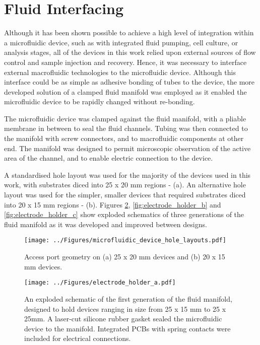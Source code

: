 \section{Fluid Interfacing}
\label{Section:Fluid_interfacing}

Although it has been shown possible to achieve a high level of integration within a microfluidic device, such as with integrated fluid pumping, cell culture, or analysis stages, all of the devices in this work relied upon external sources of flow control and sample injection and recovery. Hence, it was necessary to interface external macrofluidic technologies to the microfluidic device. Although this interface could be as simple as adhesive bonding of tubes to the device, the more developed solution of a clamped fluid manifold was employed as it enabled the microfluidic device to be rapidly changed without re-bonding.

The microfluidic device was clamped against the fluid manifold, with a pliable membrane in between to seal the fluid channels. Tubing was then connected to the manifold with screw connectors, and to macrofluidic components at other end. The manifold was designed to permit microscopic observation of the active area of the channel, and to enable electric connection to the device.

A standardised hole layout was used for the majority of the devices used in this work, with substrates diced into 25 x 20 mm regions -   (a). An alternative hole layout was used for the simpler, smaller devices that required substrates diced into 20 x 15 mm regions -  (b). Figures \ref{fig:electrode_holder_a}, \ref{fig:electrode_holder_b} and \ref{fig:electrode_holder_c} show exploded schematics of three generations of the fluid manifold as it was developed and improved between designs.

\begin{figure}
	\centering
		\texttt{[image: ../Figures/microfluidic\_device\_hole\_layouts.pdf]}
	\caption[Access port geometry on 25 x 20 mm and 20 x 15 mm devices.]{Access port geometry on (a) 25 x 20 mm devices and (b) 20 x 15 mm devices.}
	\label{fig:microfluidic_device_hole_layouts}
\end{figure}




\begin{figure}[p]
	\centering
		\texttt{[image: ../Figures/electrode\_holder\_a.pdf]}
	\caption[Exploded schematic of the first generation of the fluid manifold.]{An exploded schematic of the first generation of the fluid manifold, designed to hold devices ranging in size from 25 x 15 mm to 25 x 25mm. A laser-cut silicone rubber gasket sealed the microfluidic device to the manifold. Integrated PCBs with spring contacts were included for electrical connections.}
	\label{fig:electrode_holder_a}
\end{figure}

